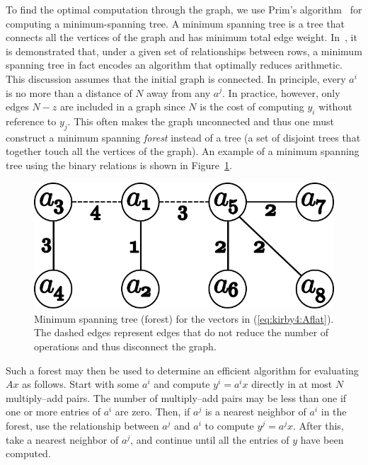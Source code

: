 To find the optimal computation through the graph, we use Prim's
algorithm~\cite{prim} for computing a minimum-spanning tree. A minimum
spanning tree is a tree that connects all the vertices of the graph
and has minimum total edge weight. In~\cite{KirEtAl2006}, it is
demonstrated that, under a given set of relationships between rows, a
minimum spanning tree in fact encodes an algorithm that optimally
reduces arithmetic.  This discussion assumes that the initial graph is
connected. In principle, every \( a^i \) is no more than a distance
of \( N \) away from any \( a^j \). In practice, however, only
edges \( N - z \) are included in a graph since $N$ is the cost of
computing \( y_i \) without reference to \( y_j \). This often makes
the graph unconnected and thus one must construct a minimum
spanning \emph{forest} instead of a tree (a set of disjoint trees that
together touch all the vertices of the graph). An example of a minimum
spanning tree using the binary relations is shown in
Figure~\ref{fig:kirby4:mst}.

\begin{figure}
  \begin{center}
   \includegraphics[width=\smallfig]{chapters/kirby-4/pdf/small_mst.pdf}
    \caption{Minimum spanning tree (forest) for the vectors in
      (\ref{eq:kirby4:Aflat}). The dashed edges represent edges that do
    not reduce the number of operations and thus disconnect the graph.}
    \label{fig:kirby4:mst}
  \end{center}
\end{figure}

Such a forest may then be used to determine an efficient algorithm for
evaluating \( A x \) as follows. Start with some \( a^i \) and
compute \( y^i = a^i x \) directly in at most \( N \) multiply--add
pairs. The number of multiply--add pairs may be less than one if one
or more entries of $a^i$ are zero. Then, if \( a^j \) is a nearest
neighbor of \( a^i \) in the forest, use the relationship between \(
a^j \) and \( a^i \) to compute \( y^j = a^j x \).  After this, take a
nearest neighbor of \( a^j \), and continue until all the entries of
\( y \) have been computed.

